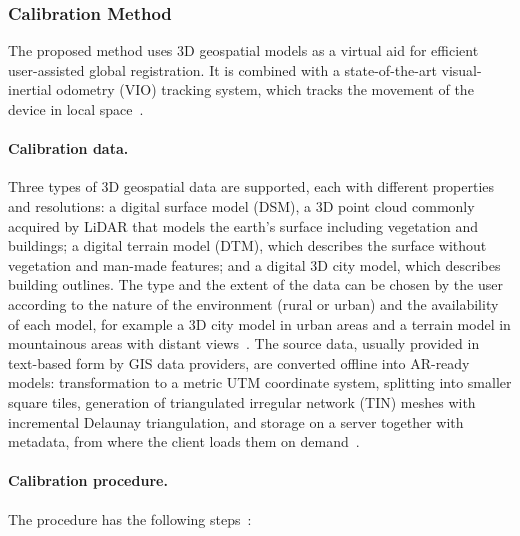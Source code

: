 \subsubsection{Calibration Method}
\label{sec:burkard2022_metodo}

The proposed method uses 3D geospatial models as a virtual aid for efficient user-assisted global registration. It is combined with a state-of-the-art visual-inertial odometry (VIO) tracking system, which tracks the movement of the device in local space~\cite{burkard2022gistam}.

\paragraph{Calibration data.} Three types of 3D geospatial data are supported, each with different properties and resolutions: a digital surface model (DSM), a 3D point cloud commonly acquired by LiDAR that models the earth's surface including vegetation and buildings; a digital terrain model (DTM), which describes the surface without vegetation and man-made features; and a digital 3D city model, which describes building outlines. The type and the extent of the data can be chosen by the user according to the nature of the environment (rural or urban) and the availability of each model, for example a 3D city model in urban areas and a terrain model in mountainous areas with distant views~\cite{burkard2022gistam}. The source data, usually provided in text-based form by GIS data providers, are converted offline into AR-ready models: transformation to a metric UTM coordinate system, splitting into smaller square tiles, generation of triangulated irregular network (TIN) meshes with incremental Delaunay triangulation, and storage on a server together with metadata, from where the client loads them on demand~\cite{burkard2022gistam}.

\paragraph{Calibration procedure.} The procedure has the following steps~\cite{burkard2022gistam}:

